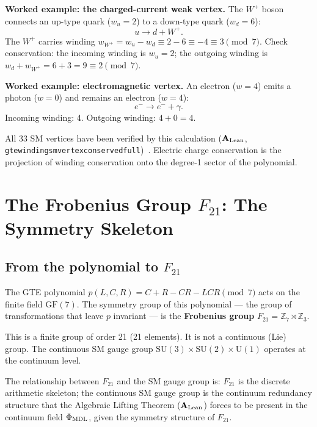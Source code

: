 \documentclass[11pt,a4paper]{article}
\newcommand{\term}[1]{\textbf{#1}}
\newcommand{\lean}[1]{%
  \penalty-100
  \begingroup\def\_{\textunderscore\allowbreak}\texttt{#1}\endgroup}
\newcommand{\CatAL}{\ensuremath{\mathbf{A}_{\rm Lean}}}
\begin{document}
\textbf{Worked example: the charged-current weak vertex.}
The $W^+$ boson connects an up-type quark ($w_u = 2$) to a down-type quark ($w_d = 6$):
\[
  u \to d + W^+.
\]
The $W^+$ carries winding $w_{W^+} = w_u - w_d \equiv 2 - 6 \equiv -4 \equiv 3 \pmod{7}$.
Check conservation: the incoming winding is $w_u = 2$; the outgoing winding is
$w_d + w_{W^+} = 6 + 3 = 9 \equiv 2 \pmod{7}$. \checkmark

\textbf{Worked example: electromagnetic vertex.}
An electron ($w = 4$) emits a photon ($w = 0$) and remains an electron ($w = 4$):
\[
  e^- \to e^- + \gamma.
\]
Incoming winding: 4. Outgoing winding: $4 + 0 = 4$. \checkmark

All 33 SM vertices have been verified by this calculation (\CatAL,
\lean{gte\_winding\_sm\_vertex\_conserved\_full})~\cite{SpivackGTECompleteFramework}.
Electric charge conservation is the projection of winding conservation
onto the degree-1 sector of the polynomial.

\section{The Frobenius Group $F_{21}$: The Symmetry Skeleton}
\label{sec:f21}

\subsection{From the polynomial to $F_{21}$}

The GTE polynomial $p(L,C,R) = C + R - CR - LCR \pmod{7}$ acts on the
finite field $\mathrm{GF}(7)$.
The symmetry group of this polynomial --- the group of transformations
that leave $p$ invariant --- is the \term{Frobenius group}
$F_{21} = \mathbb{Z}_7 \rtimes \mathbb{Z}_3$.

This is a finite group of order 21 (21 elements).
It is not a continuous (Lie) group.
The continuous SM gauge group $\mathrm{SU}(3) \times \mathrm{SU}(2) \times \mathrm{U}(1)$
operates at the continuum level.

The relationship between $F_{21}$ and the SM gauge group is:
$F_{21}$ is the discrete arithmetic skeleton; the continuous SM gauge group
is the continuum redundancy structure that the Algebraic Lifting Theorem
(\CatAL) forces to be present in the continuum field $\Phi_{\rm MDL}$,
given the symmetry structure of $F_{21}$.
\end{document}
